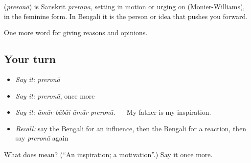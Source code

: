 \begin{cousinweb}
\textbf{} (\emph{preronā}) is Sanskrit \emph{preraṇa}, setting in motion or urging on (Monier-Williams), in the feminine form. In Bengali it is the person or idea that pushes you forward.
\end{cousinweb}

\begin{grammarlens}[title={What you've built}]
One more word for giving reasons and opinions.
\end{grammarlens}

\subsection*{Your turn}
\begin{itemize}
\raggedright
  \item \emph{Say it:} \emph{preronā}
  \item \emph{Say it:} \emph{preronā}, once more
  \item \emph{Say it:} \emph{āmār bābāi āmār preronā.} — My father is my inspiration.
  \item \emph{Recall:} say the Bengali for an influence, then the Bengali for a reaction, then say \emph{preronā} again
\end{itemize}

\begin{tcolorbox}[breakable,colback=teal!4,colframe=teal!35!black,title={Before you move on}]
What does  mean? (\textquotedblleft{}An inspiration; a motivation\textquotedblright{}.) Say it once more.
\end{tcolorbox}

